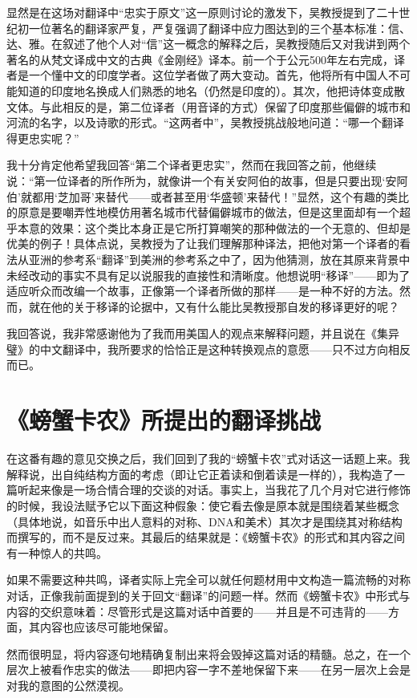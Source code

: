 显然是在这场对翻译中“忠实于原文”这一原则讨论的激发下，吴教授提到了二十世纪初一位著名的翻译家严复，严复强调了翻译中应力图达到的三个基本标准：信、达、雅。在叙述了他个人对“信”这一概念的解释之后，吴教授随后又对我讲到两个著名的从梵文译成中文的古典《金刚经》译本。前一个于公元500年左右完成，译者是一个懂中文的印度学者。这位学者做了两大变动。首先，他将所有中国人不可能知道的印度地名换成人们熟悉的地名（仍然是印度的）。其次，他把诗体变成散文体。与此相反的是，第二位译者（用音译的方式）保留了印度那些偏僻的城市和河流的名字，以及诗歌的形式。“这两者中”，吴教授挑战般地问道：“哪一个翻译得更忠实呢？”

我十分肯定他希望我回答“第二个译者更忠实”，然而在我回答之前，他继续说：“第一位译者的所作所为，就像讲一个有关安阿伯的故事，但是只要出现‘安阿伯’就都用‘芝加哥’来替代——或者甚至用‘华盛顿’来替代！”显然，这个有趣的类比的原意是要嘲弄性地模仿用著名城市代替偏僻城市的做法，但是这里面却有一个超乎本意的效果：这个类比本身正是它所打算嘲笑的那种做法的一个无意的、但却是优美的例子！具体点说，吴教授为了让我们理解那种译法，把他对第一个译者的看法从亚洲的参考系“翻译”到美洲的参考系之中了，因为他猜测，放在其原来背景中未经改动的事实不具有足以说服我的直接性和清晰度。他想说明“移译”——即为了适应听众而改编一个故事，正像第一个译者所做的那样——是一种不好的方法。然而，就在他的关于移译的论据中，又有什么能比吴教授那自发的移译更好的呢？

我回答说，我非常感谢他为了我而用美国人的观点来解释问题，并且说在《集异璧》的中文翻译中，我所要求的恰恰正是这种转换观点的意愿——只不过方向相反而已。

\section{《螃蟹卡农》所提出的翻译挑战}

在这番有趣的意见交换之后，我们回到了我的“螃蟹卡农”式对话这一话题上来。我解释说，出自纯结构方面的考虑（即让它正着读和倒着读是一样的），我构造了一篇听起来像是一场合情合理的交谈的对话。事实上，当我花了几个月对它进行修饰的时候，我设法赋予它以下面这种假象：使它看去像是原本就是围绕着某些概念（具体地说，如音乐中出人意料的对称、DNA和美术）其次才是围绕其对称结构而撰写的，而不是反过来。其最后的结果就是：《螃蟹卡农》的形式和其内容之间有一种惊人的共鸣。

如果不需要这种共鸣，译者实际上完全可以就任何题材用中文构造一篇流畅的对称对话，正像我前面提到的关于回文“翻译”的问题一样。然而《螃蟹卡农》中形式与内容的交织意味着：尽管形式是这篇对话中首要的——并且是不可违背的——方面，其内容也应该尽可能地保留。

然而很明显，将内容逐句地精确复制出来将会毁掉这篇对话的精髓。总之，在一个层次上被看作忠实的做法——即把内容一字不差地保留下来——在另一层次上会是对我的意图的公然漠视。

